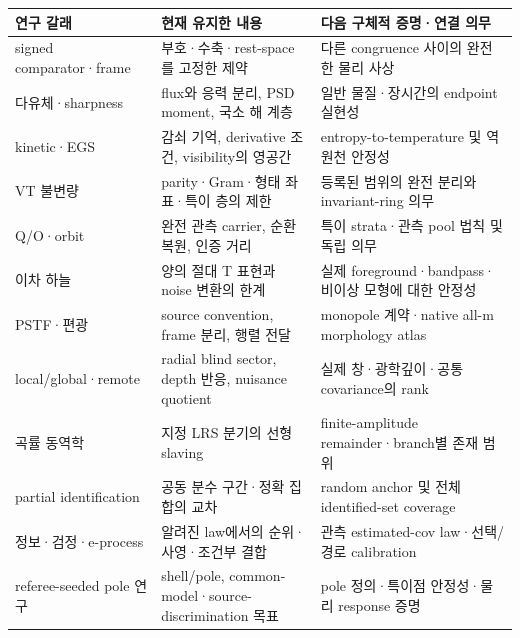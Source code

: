 \documentclass[11pt,a4paper]{article}
\begin{document}
{\small\setlength{\tabcolsep}{4pt}\renewcommand{\arraystretch}{1.3}

\begin{longtable}{>{\raggedright\arraybackslash}p{0.2300\dimexpr\linewidth-24pt\relax}>{\raggedright\arraybackslash}p{0.2900\dimexpr\linewidth-24pt\relax}>{\raggedright\arraybackslash}p{0.4800\dimexpr\linewidth-24pt\relax}}\toprule

연구 갈래 & 현재 유지한 내용 & 다음 구체적 증명·연결 의무 \\

\midrule\endhead

signed comparator·frame & 부호·수축·rest-space를 고정한 제약 & 다른 congruence 사이의 완전한 물리 사상 \\

다유체·sharpness & flux와 응력 분리, PSD moment, 국소 해 계층 & 일반 물질·장시간의 endpoint 실현성 \\

kinetic·EGS & 감쇠 기억, derivative 조건, visibility의 영공간 & entropy-to-temperature 및 역원천 안정성 \\

VT 불변량 & parity·Gram·형태 좌표·특이 층의 제한 & 등록된 범위의 완전 분리와 invariant-ring 의무 \\

Q/O·orbit & 완전 관측 carrier, 순환 복원, 인증 거리 & 특이 strata·관측 pool 법칙 및 독립 의무 \\

이차 하늘 & 양의 절대 T 표현과 noise 변환의 한계 & 실제 foreground·bandpass·비이상 모형에 대한 안정성 \\

PSTF·편광 & source convention, frame 분리, 행렬 전달 & monopole 계약·native all-m morphology atlas \\

local/global·remote & radial blind sector, depth 반응, nuisance quotient & 실제 창·광학깊이·공통 covariance의 rank \\

곡률 동역학 & 지정 LRS 분기의 선형 slaving & finite-amplitude remainder·branch별 존재 범위 \\

partial identification & 공동 분수 구간·정확 집합의 교차 & random anchor 및 전체 identified-set coverage \\

정보·검정·e-process & 알려진 law에서의 순위·사영·조건부 결합 & 관측 estimated-cov law·선택/경로 calibration \\

referee-seeded pole 연구 & shell/pole, common-model·source-discrimination 목표 & pole 정의·특이점 안정성·물리 response 증명 \\

\bottomrule\end{longtable}}
\end{document}

